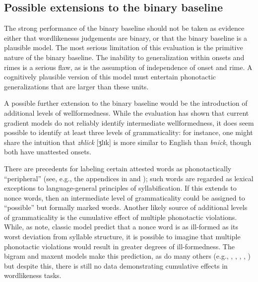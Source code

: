 
\subsection{Possible extensions to the binary baseline}

The strong performance of the binary baseline should not be taken as evidence either that wordlikenesss judgements are binary, or that the binary baseline is a plausible model. The most serious limitation of this evaluation is the primitive nature of the binary baseline. The inability to generalization within onsets and rimes is a serious flaw, as is the assumption of independence of onset and rime. A cognitively plausible version of this model must entertain phonotactic generalizations that are larger than these units.

A possible further extension to the binary baseline would be the introduction of additional levels of wellformedness. While the evaluation has shown that current gradient models do not reliably identify intermediate wellformedness, it does seem possible to identify at least three levels of grammaticality: for instance, one might share the intuition that \emph{zhlick} [ʒlɪk] is more similar to English than \emph{bnick}, though both have unattested onsets. 

There are precedents for labeling certain attested words as phonotactically ``peripheral'' (see, e.g., the appendices in \citealt{Myers1987} and \citealt{Borowsky1989}); such words are regarded as lexical exceptions to language-general principles of syllabification. If this extends to nonce words, then an intermediate level of grammaticality could be assigned to ``possible'' but formally marked words. Another likely source of additional levels of grammaticality is the cumulative effect of multiple phonotactic violations. While, as \citet{Coleman1997} note, classic model predict that a nonce word is as ill-formed as its worst deviation from syllable structure, it is possible to imagine that multiple phonotactic violations would result in greater degrees of ill-formedness. The bigram and maxent models make this prediction, as do many others (e.g., \citealt{Legendre1990}, \citealt{Levelt2000}, \citealt{Albright2008}, \citealt{Anttila2008}, \citealt{Pater2009b}) but despite this, there is still no data demonstrating cumulative effects in wordlikeness tasks.

